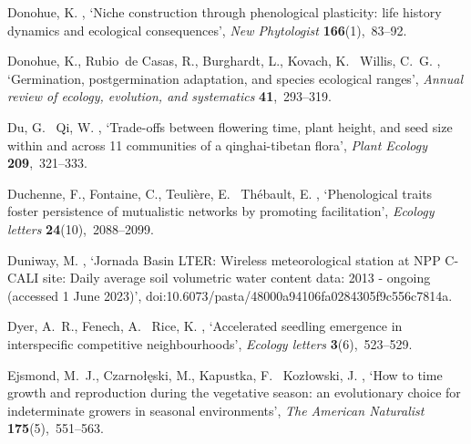 \documentclass[11pt]{article}
\begin{document}
\begin{thebibliography}{xx}
Donohue, K.  \harvardyearright , `Niche construction
  through phenological plasticity: life history dynamics and ecological
  consequences', {\em New Phytologist} {\bf 166}(1),~83--92.

Donohue, K., Rubio~de Casas, R., Burghardt, L., Kovach, K. \harvardand\ Willis,
  C.~G.  \harvardyearright , `Germination, postgermination
  adaptation, and species ecological ranges', {\em Annual review of ecology,
  evolution, and systematics} {\bf 41},~293--319.

Du, G. \harvardand\ Qi, W.  \harvardyearright ,
  `Trade-offs between flowering time, plant height, and seed size within and
  across 11 communities of a qinghai-tibetan flora', {\em Plant Ecology} {\bf
  209},~321--333.

Duchenne, F., Fontaine, C., Teuli{\`e}re, E. \harvardand\ Th{\'e}bault, E.
  \harvardyearleft 2021\harvardyearright , `Phenological traits foster
  persistence of mutualistic networks by promoting facilitation', {\em Ecology
  letters} {\bf 24}(10),~2088--2099.

Duniway, M.  \harvardyearright , `{Jornada Basin LTER:
  Wireless meteorological station at NPP C-CALI site: Daily average soil
  volumetric water content data: 2013 - ongoing (accessed 1 June 2023)}',
  doi:10.6073/pasta/48000a94106fa0284305f9c556c7814a.

Dyer, A.~R., Fenech, A. \harvardand\ Rice, K.  \harvardyearleft
  2000\harvardyearright , `Accelerated seedling emergence in interspecific
  competitive neighbourhoods', {\em Ecology letters} {\bf 3}(6),~523--529.

Ejsmond, M.~J., Czarno{\l}{\k{e}}ski, M., Kapustka, F. \harvardand\
  Koz{\l}owski, J.  \harvardyearright , `How to time
  growth and reproduction during the vegetative season: an evolutionary choice
  for indeterminate growers in seasonal environments', {\em The American
  Naturalist} {\bf 175}(5),~551--563.


\end{thebibliography}
\end{document}
